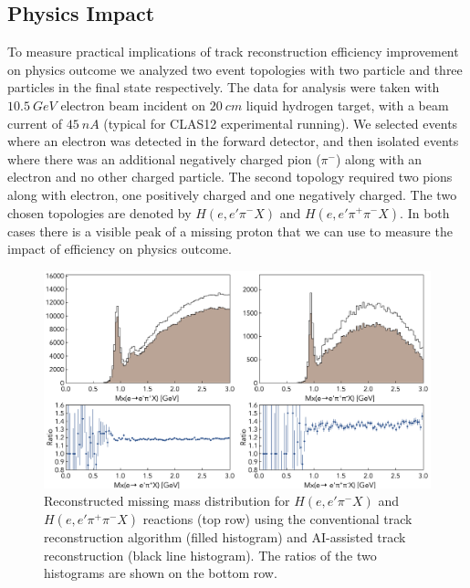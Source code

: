 \subsection{Physics Impact}

To measure practical implications of track reconstruction efficiency improvement on physics outcome we analyzed 
two event topologies with two particle and three particles in the final state respectively. The data for analysis were 
taken with $10.5~GeV$ electron beam incident on $20~cm$ liquid hydrogen target, with a beam current of $45~nA$
(typical for CLAS12 experimental running). We selected events where an electron was detected in the forward detector, and 
then isolated events where there was an additional negatively charged pion ($\pi^-$) along with an electron and no other 
charged particle. The second topology required two pions along with electron, one positively charged and one 
negatively charged. The two chosen topologies are denoted by $H(e,e'\pi^-X)$ and $H(e,e'\pi^+\pi^-X)$. In both cases 
there is a visible peak of a missing proton that we can use to measure the impact of efficiency on physics outcome. 

 \begin{figure}[!ht]
\begin{center}
 \includegraphics[width=6.0in]{images/physics_scan.pdf}
\caption {Reconstructed missing mass distribution for $H(e,e'\pi^-X)$ and $H(e,e'\pi^+\pi^-X)$ reactions (top row) using the conventional track reconstruction algorithm (filled histogram) and  AI-assisted track reconstruction (black line histogram). The ratios of the two histograms are shown on the bottom row. }
 \label{physics:outcome}
 \end{center}
\end{figure}

